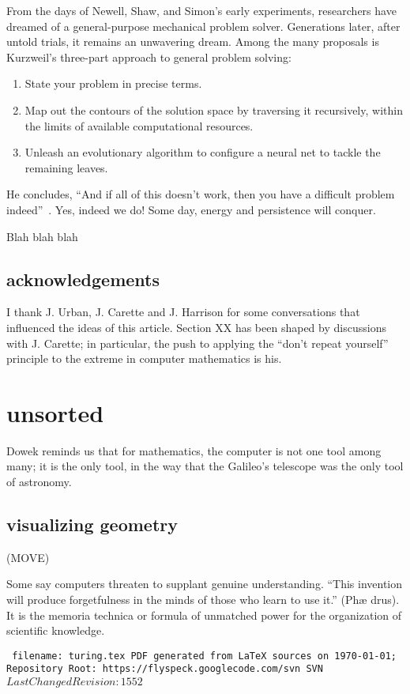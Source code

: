 \documentclass{llncs}
\def\svninfo{{\tt
  filename: turing.tex\hfill\break
  PDF generated from LaTeX sources on \today; \hfill\break
  Repository Root: https://flyspeck.googlecode.com/svn \hfill\break
  SVN $LastChangedRevision: 1552 $
  }
  }
\begin{document}
From the days of Newell, Shaw, and Simon's early experiments, researchers
have dreamed of a general-purpose mechanical problem solver.  Generations later,
after untold trials, it remains an unwavering dream.  Among the many
proposals is Kurzweil's three-part approach to general problem solving:
\begin{enumerate} 
\item State your problem in precise terms.
\item Map out the contours of the solution space by traversing it
  recursively, within the limits of available computational resources.
\item Unleash an evolutionary algorithm to configure a neural net to
  tackle the remaining leaves.
\end{enumerate}
He concludes, ``And if all of this doesn't work, then you have a
difficult problem indeed''~\cite{Ku99}.  Yes, indeed we do!  Some day,
energy and persistence will conquer.

\bigskip
Blah blah blah




\subsection{acknowledgements}

I thank J. Urban, J. Carette and J. Harrison 
for some conversations that influenced the ideas of this article.
Section XX has been shaped by
discussions with J. Carette; in particular, the push to applying the
``don't repeat yourself'' principle to the extreme in computer mathematics is
his.


\section{unsorted}

Dowek reminds us that for mathematics, the computer is not one tool among
many; it is the only tool, in the way that the Galileo's telescope was the only
tool of astronomy.

\subsection{visualizing geometry}

(MOVE)

Some say computers threaten to supplant genuine
understanding.  ``This invention will produce
forgetfulness in the minds of those who learn to use it.'' (Ph\ae
drus).  
It is the memoria technica or formula of unmatched power for the
organization of scientific knowledge.



\raggedright



\bigskip
\noindent
\svninfo
\end{document}
